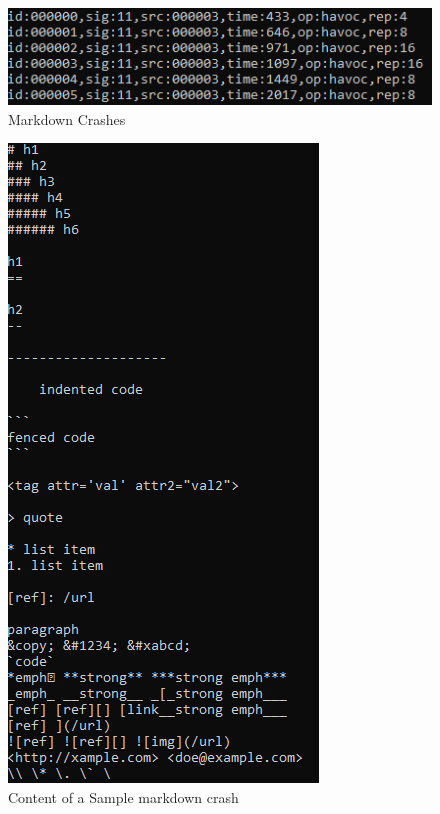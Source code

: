 \documentclass[12pt]{diazessay}
\begin{document}
\begin{figure}
	\centering
	\includegraphics[scale=1.0, trim={0 3cm 0 0}, clip]{markdowncrashes.png}
	\caption{Markdown Crashes}
\end{figure}


\begin{figure}
	\centering
	\includegraphics[scale=1.0, trim={0 3cm 0 0}, clip]{markdownsamplecatcrash.png}
    \caption{Content of a Sample markdown crash}
\end{figure}

\clearpage



\end{document}
